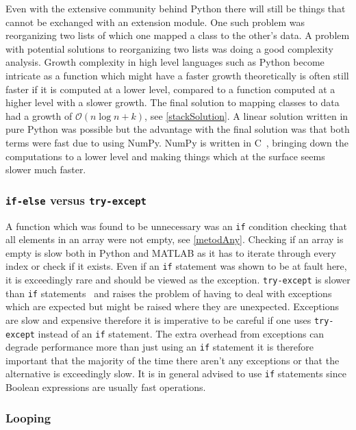 \documentclass[12pt, a4paper]{article}
\begin{document}
Even with the extensive community behind Python there will still be things that cannot be exchanged with an extension module.
One such problem was reorganizing two lists of which one mapped a class to the other's data.
A problem with potential solutions to reorganizing two lists was doing a good complexity analysis.
Growth complexity in high level languages such as Python become intricate as a function which might have a faster growth theoretically is often still faster if it is computed at a lower level, compared to a function computed at a higher level with a slower growth.
The final solution to mapping classes to data had a growth of $\mathcal{O}(n\log n + k)$, see \cref{stackSolution}.
A linear solution written in pure Python was possible but the advantage with the final solution was that both terms were fast due to using NumPy.
NumPy is written in C~\cite{Numpy:Fast}, bringing down the computations to a lower level and making things which at the surface seems slower much faster.
\newpage
\label{stackSolution}

\subsubsection{\texttt{if-else} versus \texttt{try-except}}

A function which was found to be unnecessary was an \texttt{if} condition checking that all elements in an array were not empty, see \cref{metodAny}.
Checking if an array is empty is slow both in Python and MATLAB as it has to iterate through every index or check if it exists.
Even if an \texttt{if} statement was shown to be at fault here, it is exceedingly rare and should be viewed as the exception.
\texttt{try-except} is slower than \texttt{if} statements~\cite{pythonBook} and raises the problem of having to deal with exceptions which are expected but might be raised where they are unexpected.
Exceptions are slow and expensive therefore it is imperative to be careful if one uses \texttt{try-except} instead of an \texttt{if} statement.
The extra overhead from exceptions can degrade performance more than just using an \texttt{if} statement it is therefore important that the majority of the time there aren't any exceptions or that the alternative is exceedingly slow.
It is in general advised to use \texttt{if} statements since Boolean expressions are usually fast operations.

\subsubsection{Looping}
\end{document}

